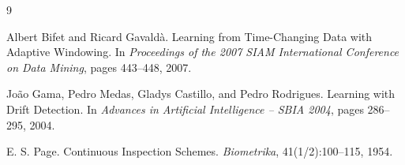 \begin{thebibliography}{9}

Albert Bifet and Ricard Gavald\`a.
Learning from Time-Changing Data with Adaptive Windowing.
In \emph{Proceedings of the 2007 SIAM International Conference on Data Mining}, pages 443--448, 2007.

Jo\~ao Gama, Pedro Medas, Gladys Castillo, and Pedro Rodrigues.
Learning with Drift Detection.
In \emph{Advances in Artificial Intelligence -- SBIA 2004}, pages 286--295, 2004.

E. S. Page.
Continuous Inspection Schemes.
\emph{Biometrika}, 41(1/2):100--115, 1954.

\end{thebibliography}